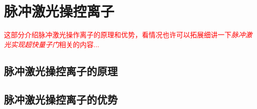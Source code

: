 
\chapter[脉冲激光操控离子]{脉冲激光操控离子}

\textcolor{red}{\small
这部分介绍脉冲激光操作离子的原理和优势，看情况也许可以拓展细讲一下\emph{脉冲激光实现超快量子门}相关的内容...
}

\section[脉冲激光操控离子的原理]{脉冲激光操控离子的原理}


\section[脉冲激光操控离子的优势]{脉冲激光操控离子的优势}


